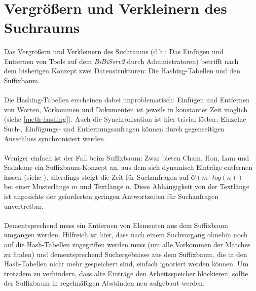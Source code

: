 \newpage

\section{Vergrößern und Verkleinern des Suchraums}
\label{meth-addAndRemove}

\paragraph{} Das Vergrößern und Verkleinern des Suchraums (d.h.: Das Einfügen und Entfernen von Tools auf dem \textit{BiBiServ2} durch Administratoren) betrifft nach dem bisherigen Konzept zwei Datenstrukturen: Die Hashing-Tabellen und den Suffixbaum.
\paragraph{} Die Hashing-Tabellen erscheinen dabei unproblematisch: Einfügen und Entfernen von Worten, Vorkommen und Dokumenten ist jeweils in konstanter Zeit möglich (siehe \ref{meth-hashing}). Auch die Synchronisation ist hier trivial lösbar: Einzelne Such-, Einfügungs- und Entfernungsanfragen können durch gegenseitigen Ausschluss synchronisiert werden.
\paragraph{} Weniger einfach ist der Fall beim Suffixbaum: Zwar bieten Cham, Hon, Lam und Sadakane ein Suffixbaum-Konzept an, aus dem sich dynamisch Einträge entfernen lassen (siehe \cite{dynamicTrees}), allerdings steigt die Zeit für Suchanfragen auf $\mathcal{O}(m \cdot log(n))$ bei einer Musterlänge $m$ und Textlänge $n$. Diese Abhängigkeit von der Textlänge ist angesichts der geforderten geringen Antwortzeiten für Suchanfragen unvertretbar.
\paragraph{} Dementsprechend muss ein Entfernen von Elementen aus dem Suffixbaum umgangen werden. Hilfreich ist hier, dass nach einem Suchvorgang ohnehin noch auf die Hash-Tabellen zugegriffen werden muss (um alle Vorkommen der Matches zu finden) und dementsprechend Suchergebnisse aus dem Suffixbaum, die in den Hash-Tabellen nicht mehr gespeichert sind, einfach ignoriert werden können. Um trotzdem zu verhindern, dass alte Einträge den Arbeitsspeicher blockieren, sollte der Suffixbaum in regelmäßigen Abständen neu aufgebaut werden.
